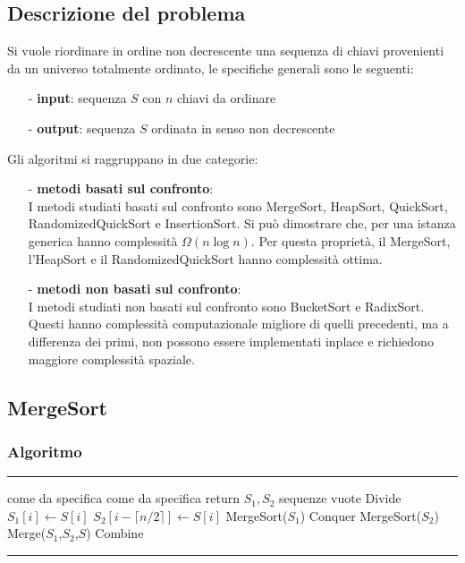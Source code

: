 \documentclass[a4paper]{article}
\makeatletter
\newenvironment{algo}[4]{
	\noindent\rule{\textwidth}{0.4pt}
	\begin{algorithmic}[1]
		\addtocounter{ALG@line}{-1}
		\Procedure{#1}{#2}
		\Require #3
		\Ensure #4
		\Statex }{
		\EndProcedure
	\end{algorithmic}
	\rule{\textwidth}{0.4pt}}
\makeatother
\begin{document}
\subsection{Descrizione del problema}
Si vuole riordinare in ordine non decrescente una sequenza di chiavi provenienti da un universo totalmente ordinato, le specifiche
generali sono le seguenti:
\begin{itemize}[topsep=3pt, itemsep=0pt]
	\item[-] \textbf{input}: sequenza \(S\) con \(n\) chiavi da ordinare
	\item[-] \textbf{output}: sequenza \(S\) ordinata in senso non decrescente
\end{itemize}
Gli algoritmi si raggruppano in due categorie:
\begin{itemize}[topsep=3pt, itemsep=0pt]
	\item[-] \textbf{metodi basati sul confronto}: \\
	I metodi studiati basati sul confronto sono MergeSort, HeapSort, QuickSort, RandomizedQuickSort e InsertionSort. Si può dimostrare
	che, per una istanza generica hanno complessità \(\Omega(n \log n)\). Per questa proprietà, il MergeSort, l'HeapSort e il RandomizedQuickSort
	hanno complessità ottima.
	\item[-] \textbf{metodi non basati sul confronto}: \\
	I metodi studiati non basati sul confronto sono BucketSort e RadixSort. Questi hanno complessità computazionale migliore di
	quelli precedenti, ma a differenza dei primi, non possono essere implementati inplace e richiedono maggiore complessità spaziale.
\end{itemize}

\subsection{MergeSort}
\subsubsection*{Algoritmo}
\begin{algo}{MergeSort}{$S$}{come da specifica}{come da specifica}
	 return
	\Else
		\State \(S_1, S_2\) sequenze vuote \Comment Divide
		 \(S_1[i] \gets S[i]\)
		\EndFor
		 \(S_2[i-\lceil n/2 \rceil] \gets S[i]\)
		\EndFor
		\State MergeSort(\(S_1\)) \Comment Conquer
		\State MergeSort(\(S_2\))
		\State Merge(\(S_1\),\(S_2\),\(S\)) \Comment Combine
	\EndIf
\end{algo}
\end{document}
